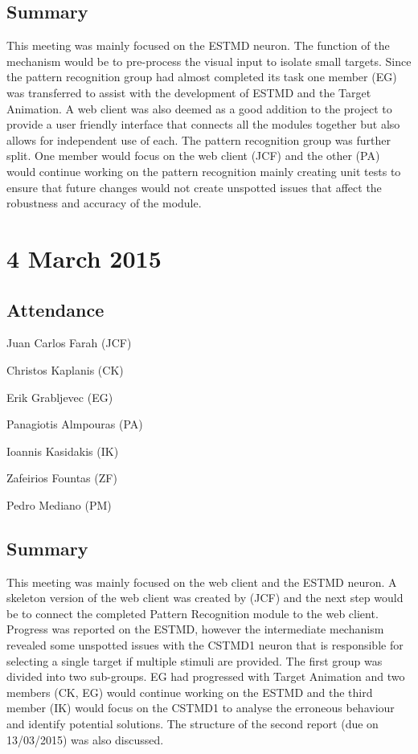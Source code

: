 \documentclass[a4paper,11pt]{article}
\begin{document}
\begin{appendices}
\subsection*{Summary}
This meeting was mainly focused on the ESTMD neuron. The function of the mechanism would be to pre-process the visual input to isolate small targets. Since the pattern recognition group had almost completed its task one member (EG) was transferred to assist with the development of ESTMD and the Target Animation. A web client was also deemed as a good addition to the project to provide a user friendly interface that connects all the modules together but also allows for independent use of each. The pattern recognition group was further split. One member would focus on the web client (JCF) and the other (PA) would continue working on the pattern recognition mainly creating unit tests to ensure that future changes would not create unspotted issues that affect the robustness and accuracy of the module.

\maketitle
\section*{4 March 2015}
\subsection*{Attendance}
\begin{compactenum}
\item Juan Carlos Farah (JCF)
\item Christos Kaplanis (CK)
\item Erik Grabljevec (EG)
\item Panagiotis Almpouras (PA)
\item Ioannis Kasidakis (IK)
\item Zafeirios Fountas (ZF)
\item Pedro Mediano (PM)
\end{compactenum}

\subsection*{Summary}
This meeting was mainly focused on the web client and the ESTMD neuron. A skeleton version of the web client was created by (JCF) and the next step would be to connect the completed Pattern Recognition module to the web client. Progress was reported on the ESTMD, however the intermediate mechanism revealed some unspotted issues with the CSTMD1 neuron that is responsible for selecting a single target if multiple stimuli are provided. The first group was divided into two sub-groups. EG had progressed with Target Animation and two members (CK, EG) would continue working on the ESTMD and the third member (IK) would focus on the CSTMD1 to analyse the erroneous behaviour and identify potential solutions. The structure of the second report (due on 13/03/2015) was also discussed.


\end{appendices}
\end{document}
